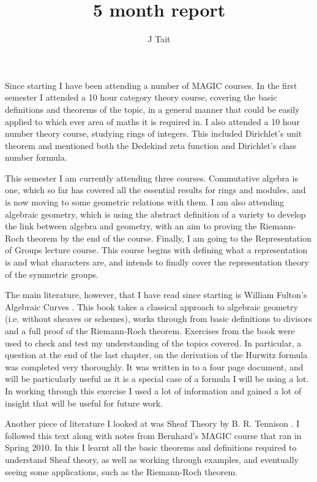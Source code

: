\documentclass[11pt]{article} %
\title{5 month report}
\author{J Tait}
\begin{document}
\maketitle

Since starting I have been attending a number of MAGIC courses. In the first semester I attended a 10 hour category theory course, covering the basic definitions and theorems of the topic, in a general manner that could be easily applied to which ever area of maths it is required in. I also attended a 10 hour number theory course, studying rings of integers. This included Dirichlet's unit theorem and mentioned both the  Dedekind zeta function and Dirichlet's class number formula.

This semester I am currently attending three courses. Commutative algebra is one, which so far has covered all the essential results for rings and modules, and is now moving to some geometric relations with them. I am also attending algebraic geometry, which is using the abstract definition of a variety to develop the link between algebra and geometry, with an aim to proving the Riemann-Roch theorem by the end of the course. Finally, I am going to the Representation of Groups lecture course. This course begins with defining what a representation is and what characters are, and intends to finally cover the representation theory of the symmetric groups.

The main literature, however, that I have read since starting is William Fulton's Algebraic Curves \citep[Fu]{fulton}. This book takes a classical approach to algebraic geometry (i.e. without sheaves or schemes),  works through from basic definitions to divisors and a full proof of the Riemann-Roch theorem. Exercises from the book were used to check and test my understanding of the topics covered. In particular, a question at the end of the last chapter, on the derivation of the Hurwitz formula was completed very thoroughly. It was written in to a four page document, and will be particularly useful as it is a special case of a formula I will be using a lot. In working through this exercise I used a lot of information and gained a lot of insight that will be useful for future work.

Another piece of literature I looked at was Sheaf Theory by B. R. Tennison \citep[Te]{tennison}. I followed this text along with notes from Bernhard's MAGIC course that ran in Spring 2010. In this I learnt all the basic theorems and definitions required to understand Sheaf theory, as well as working through examples, and eventually seeing some applications, such as the Riemann-Roch theorem.
\end{document}
